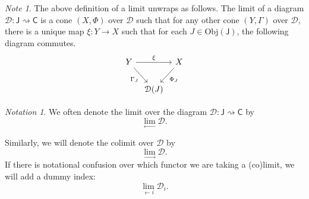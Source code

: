 \documentclass[a4paper,10pt]{scrreprt}
\newcommand{\Obj}{\mathrm{Obj}}
\theoremstyle{definition}
\theoremstyle{plain}
\theoremstyle{remark}
\newtheorem{note}{Note}[section]
\newtheorem{notation}{Notation}[section]
\begin{document}
\begin{note}
  The above definition of a limit unwraps as follows. The limit of a diagram $\mathcal{D}\colon \mathsf{J} \rightsquigarrow \mathsf{C}$ is a cone $(X, \Phi)$ over $\mathcal{D}$ such that for any other cone $(Y, \Gamma)$ over $\mathcal{D}$, there is a unique map $\xi\colon Y \to X$ such that for each $J \in \Obj(\mathsf{J})$, the following diagram commutes.
  \begin{equation*}
    \begin{tikzcd}[column sep=tiny]
      Y
      \arrow[rr, "\xi"]
      \arrow[dr, swap, "\Gamma_{J}"]
      & & X
      \arrow[dl, "\Phi_{J}"]
      \\
      & \mathcal{D}(J)
    \end{tikzcd}
  \end{equation*}
\end{note} 

\begin{notation}
  We often denote the limit over the diagram $\mathcal{D}\colon \mathsf{J} \rightsquigarrow \mathsf{C}$ by 
  \begin{equation*}
    \lim_{\leftarrow} \mathcal{D}.
  \end{equation*}

  Similarly, we will denote the colimit over $\mathcal{D}$ by 
  \begin{equation*}
    \lim_{\rightarrow} \mathcal{D}.
  \end{equation*}
  If there is notational confusion over which functor we are taking a (co)limit, we will add a dummy index:
  \begin{equation*}
    \lim_{\leftarrow i} \mathcal{D}_{i}.
  \end{equation*}
\end{notation}
\end{document}
